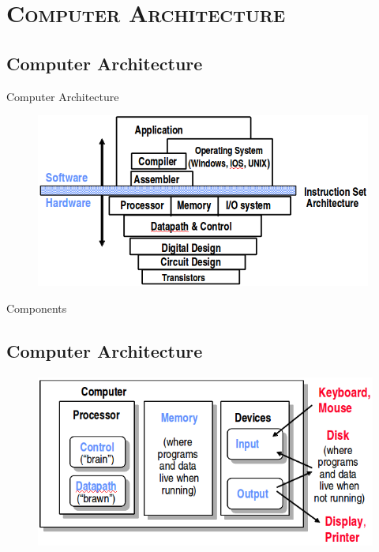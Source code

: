 \documentclass[xcolor=x11names,compress]{beamer}
\renewcommand{\(}{\begin{columns}}
\renewcommand{\)}{\end{columns}}
\newcommand{\<}[1]{\begin{column}{#1}}
\renewcommand{\>}{\end{column}}
\begin{document}
\section{\scshape Computer Architecture}
\subsection{Computer Architecture}
\begin{frame}{Computer Architecture}
 \begin{figure}
   \begin{center}
     \includegraphics[height=2.25in,clip]{ComputerArchitecture}
   \end{center}
 \end{figure}
\end{frame}

\begin{frame}{Components}
\subsection{Computer Architecture}
 \begin{figure}
   \begin{center}
     \includegraphics[height=2.25in,clip]{Components}
   \end{center}
 \end{figure}
\end{frame}
\end{document}
